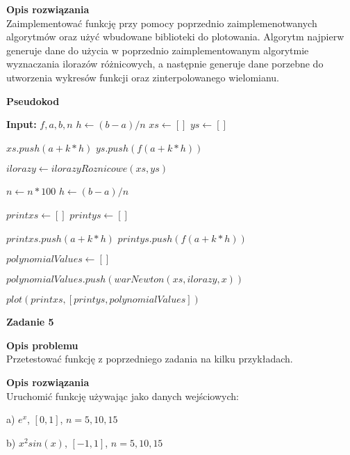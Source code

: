 \documentclass{article}
\begin{document}
\noindent \textbf{Opis rozwiązania} \\
Zaimplementować funkcję przy pomocy poprzednio zaimplemenotwanych algorytmów
oraz użyć wbudowane biblioteki do plotowania.
Algorytm najpierw generuje dane do użycia w poprzednio zaimplementowanym
algorytmie wyznaczania ilorazów różnicowych, a następnie generuje dane
porzebne do utworzenia wykresów funkcji oraz zinterpolowanego wielomianu.

\pagebreak

\noindent \textbf{Pseudokod}
\begin{algorithmic}
	\State \textbf{Input:} $f, a, b, n$
    \State $h \gets (b - a) / n$
    \State $xs \gets []$
    \State $ys \gets []$


    \State $xs.push(a + k * h)$
    \State $ys.push(f(a + k * h))$

    \EndFor

    \State $ilorazy \gets ilorazyRoznicowe(xs, ys)$

    \State $n \gets n*100$
    \State $h \gets (b - a) / n$

    \State $printxs \gets []$
    \State $printys \gets []$


    \State $printxs.push(a + k * h)$
    \State $printys.push(f(a + k * h))$

    \EndFor

    \State $polynomialValues \gets []$


    \State $polynomialValues.push(warNewton(xs, ilorazy, x))$

    \EndFor

    \State $plot(printxs, [printys, polynomialValues])$
\end{algorithmic}

\noindent \textbf{\large Zadanie 5}

\noindent \textbf{Opis problemu} \\
Przetestować funkcję z poprzedniego zadania na kilku przykładach.

\noindent \textbf{Opis rozwiązania} \\
Uruchomić funkcję używając jako danych wejściowych:

a) $e^x$, $[0,1]$, $n=5,10,15$

b) $x^2sin(x)$, $[-1,1]$, $n=5,10,15$
\end{document}
